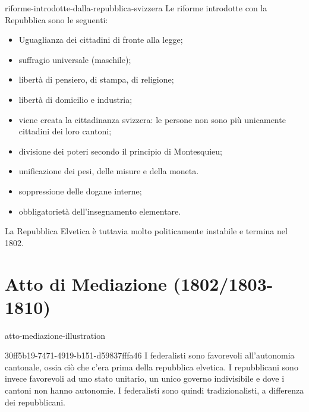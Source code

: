 \documentclass[preview]{standalone}
\begin{document}
\begin{snippet}{riforme-introdotte-dalla-repubblica-svizzera}
    Le riforme introdotte con la Repubblica sono le seguenti:
    \begin{itemize}
        \item Uguaglianza dei cittadini di fronte alla legge;
        \item suffragio universale (maschile);
        \item libertà di pensiero, di stampa, di religione;
        \item libertà di domicilio e industria;
        \item viene creata la cittadinanza svizzera: le persone non sono più unicamente cittadini dei loro cantoni;
        \item divisione dei poteri secondo il principio di Montesquieu;
        \item unificazione dei pesi, delle misure e della moneta.
        \item soppressione delle dogane interne;
        \item obbligatorietà dell'insegnamento elementare.
    \end{itemize}
\end{snippet}

\begin{plainhtml}
    La Repubblica Elvetica è tuttavia molto politicamente instabile e termina nel 1802.
\end{plainhtml}

\section{Atto di Mediazione (1802/1803-1810)}

\begin{snippet}{atto-mediazione-illustration}
    \begin{center}
    \end{center}
\end{snippet}

\begin{snippet}{30ff5b19-7471-4919-b151-d59837fffa46}
    I federalisti sono favorevoli all'autonomia cantonale, ossia ciò che c'era prima della repubblica elvetica.
    I repubblicani sono invece favorevoli ad uno stato unitario, un unico governo indivisibile e dove i cantoni non hanno autonomie.
    I federalisti sono quindi tradizionalisti, a differenza dei repubblicani.
\end{snippet}
\end{document}

